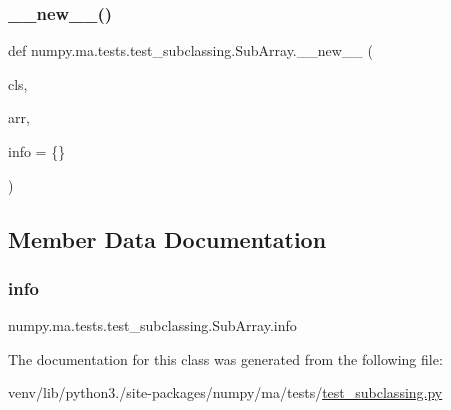 \subsubsection{\texorpdfstring{\+\_\+\+\_\+new\+\_\+\+\_\+()}{\_\_new\_\_()}}
{\footnotesize\ttfamily def numpy.\+ma.\+tests.\+test\+\_\+subclassing.\+Sub\+Array.\+\_\+\+\_\+new\+\_\+\+\_\+ (\begin{DoxyParamCaption}\item[{}]{cls,  }\item[{}]{arr,  }\item[{}]{info = {\ttfamily \{\}} }\end{DoxyParamCaption})}



\subsection{Member Data Documentation}
\mbox{\label{classnumpy_1_1ma_1_1tests_1_1test__subclassing_1_1SubArray_a0cae3b0c17520834cb96be34f0295e09}} 
\subsubsection{\texorpdfstring{info}{info}}
{\footnotesize\ttfamily numpy.\+ma.\+tests.\+test\+\_\+subclassing.\+Sub\+Array.\+info}



The documentation for this class was generated from the following file\+:\begin{DoxyCompactItemize}
\item 
venv/lib/python3./site-\/packages/numpy/ma/tests/\hyperlink{test__subclassing_8py}{test\+\_\+subclassing.\+py}\end{DoxyCompactItemize}

